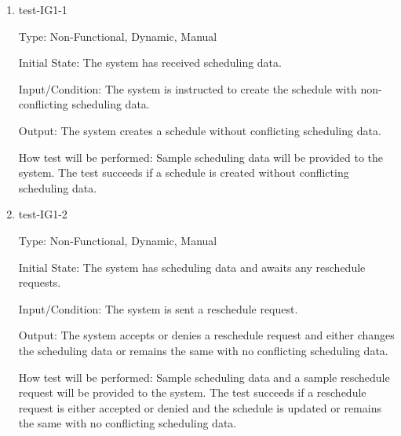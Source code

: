 \documentclass[12pt, titlepage]{article}
\begin{document}
\begin{enumerate}
  \item{test-IG1-1\\}

  Type: Non-Functional, Dynamic, Manual

  Initial State: The system has received scheduling data.

  Input/Condition: The system is instructed to create the schedule with non-conflicting
  scheduling data.

  Output: The system creates a schedule without conflicting scheduling data.

  How test will be performed: Sample scheduling data will be provided to the system. The test
  succeeds if a schedule is created without conflicting scheduling data.

  \item{test-IG1-2\\}

  Type: Non-Functional, Dynamic, Manual

  Initial State: The system has scheduling data and awaits any reschedule requests.

  Input/Condition: The system is sent a reschedule request.

  Output: The system accepts or denies a reschedule request and either changes the scheduling
  data or remains the same with no conflicting scheduling data.

  How test will be performed: Sample scheduling data and a sample reschedule request
  will be provided to the system. The test succeeds if a reschedule request is either accepted
  or denied and the schedule is updated or remains the same with no conflicting scheduling
  data.








\end{enumerate}
\end{document}
